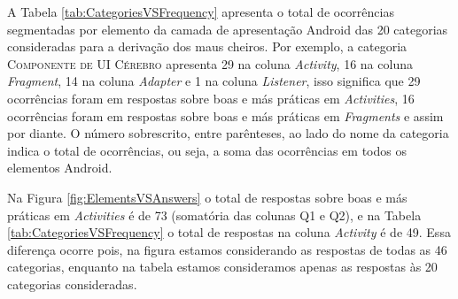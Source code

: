 A Tabela \ref{tab:CategoriesVSFrequency} apresenta o total de ocorrências segmentadas por elemento da camada de apresentação Android das 20 categorias consideradas para a derivação dos maus cheiros. Por exemplo, a categoria \textsc{\small Componente de UI Cérebro} apresenta 29 na coluna \textit{Activity}, 16 na coluna \textit{Fragment}, 14 na coluna \textit{Adapter} e 1 na coluna \textit{Listener}, isso significa que 29 ocorrências foram em respostas sobre boas e más práticas em \textit{Activities}, 16 ocorrências foram em respostas sobre boas e más práticas em \textit{Fragments} e assim por diante. O número sobrescrito, entre parênteses, ao lado do nome da categoria indica o total de ocorrências, ou seja, a soma das ocorrências em todos os elementos Android.

Na Figura \ref{fig:ElementsVSAnswers} o total de respostas sobre boas e más práticas em \textit{Activities} é de 73 (somatória das colunas Q1 e Q2), e na Tabela \ref{tab:CategoriesVSFrequency} o total de respostas na coluna \textit{Activity} é de 49. Essa diferença ocorre pois, na figura estamos considerando as respostas de todas as 46 categorias, enquanto na tabela estamos consideramos apenas as respostas às 20 categorias consideradas.

